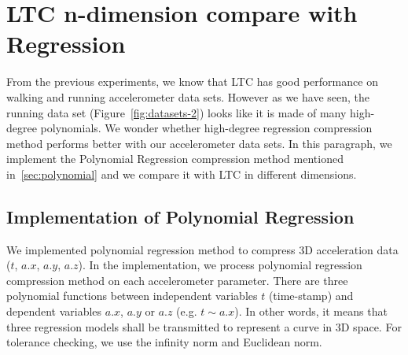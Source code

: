 \section{LTC n-dimension compare with Regression}

From the previous experiments, we know that LTC has good performance on  walking
and running accelerometer data sets. However as we have seen, the running data
set (Figure~\ref{fig:datasets-2}) looks like it is made of many high-degree
polynomials. We wonder whether high-degree regression compression method
performs better with our accelerometer data sets. In this paragraph, we
implement the Polynomial Regression compression method mentioned
in~\ref{sec:polynomial} and we compare it with LTC in different dimensions.


\subsection{Implementation of Polynomial Regression}

We implemented polynomial regression method to compress 3D acceleration data
($t$, $a.x$, $a.y$, $a.z$). In the implementation, we process polynomial
regression compression method on each accelerometer parameter. There are three
polynomial functions between independent variables $t$ (time-stamp) and
dependent variables $a.x$, $a.y$ or $a.z$ (e.g. $t \sim a.x$). In other words,
it means that three regression models shall be transmitted to represent a curve
in 3D space. For tolerance checking, we use the infinity norm and Euclidean
norm.

